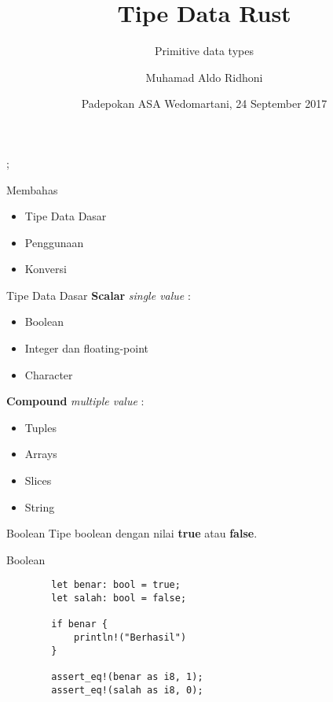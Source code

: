 \documentclass[14pt]{beamer}
\begin{document}
\author{Muhamad Aldo Ridhoni}
\title{Tipe Data Rust}
\subtitle{Primitive data types}
\date{Padepokan ASA Wedomartani, 24 September 2017}
{
\usebackgroundtemplate%
{%
    ;}%
\begin{frame}[plain]
  \maketitle
  \addtocounter{framenumber}{-1}
\end{frame}
}

\begin{frame}{Membahas}
  \begin{itemize}[<+->]
  \item Tipe Data Dasar
  \item Penggunaan
  \item Konversi
  \end{itemize}
\end{frame}

\begin{frame}{Tipe Data Dasar}
  \textbf{Scalar} \emph{single value} : 
  \begin{itemize}
  \item Boolean
  \item Integer dan floating-point
  \item Character
  \end{itemize}
  \pause
  \textbf{Compound} \emph{multiple value} :
  \begin{itemize}
  \item Tuples
  \item Arrays
  \item Slices
  \item String
  \end{itemize}
\end{frame}

\begin{frame}{Boolean}
Tipe boolean dengan nilai \textbf{true} atau \textbf{false}.
\end{frame}

\begin{frame}[fragile]{Boolean}
\begin{verbatim}
        let benar: bool = true;
        let salah: bool = false;
        
        if benar {
            println!("Berhasil")
        }
        
        assert_eq!(benar as i8, 1);
        assert_eq!(salah as i8, 0);
\end{verbatim}
\end{frame}
\end{document}
